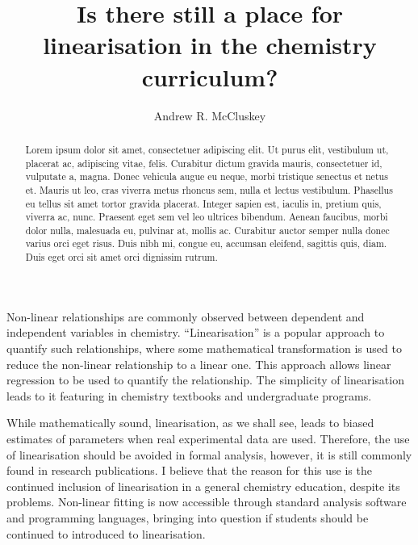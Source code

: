 \documentclass[reprint,superscriptaddress,nobibnotes,amsmath,amssymb]{revtex4-2}
\begin{document}
\title{Is there still a place for linearisation in the chemistry curriculum?}

\author{Andrew R. McCluskey}

\begin{abstract}
    Lorem ipsum dolor sit amet, consectetuer adipiscing elit.
    Ut purus elit, vestibulum ut, placerat ac, adipiscing vitae, felis.
    Curabitur dictum gravida mauris, consectetuer id, vulputate a, magna.
    Donec vehicula augue eu neque, morbi tristique senectus et netus et.
    Mauris ut leo, cras viverra metus rhoncus sem, nulla et lectus vestibulum.
    Phasellus eu tellus sit amet tortor gravida placerat.
    Integer sapien est, iaculis in, pretium quis, viverra ac, nunc.
    Praesent eget sem vel leo ultrices bibendum.
    Aenean faucibus, morbi dolor nulla, malesuada eu, pulvinar at, mollis ac.
    Curabitur auctor semper nulla donec varius orci eget risus.
    Duis nibh mi, congue eu, accumsan eleifend, sagittis quis, diam.
    Duis eget orci sit amet orci dignissim rutrum.
\end{abstract}

\maketitle 

Non-linear relationships are commonly observed between dependent and independent variables in chemistry.
``Linearisation'' is a popular approach to quantify such relationships, where some mathematical transformation is used to reduce the non-linear relationship to a linear one. 
This approach allows linear regression to be used to quantify the relationship. 
The simplicity of linearisation leads to it featuring in chemistry textbooks \cite{monk_math_2010,atkins_physical_2018} and undergraduate programs.

While mathematically sound, linearisation, as we shall see, leads to biased estimates of parameters when real experimental data are used. 
Therefore, the use of linearisation should be avoided in formal analysis, however, it is still commonly found in research publications.
I believe that the reason for this use is the continued inclusion of linearisation in a general chemistry education, despite its problems.
Non-linear fitting is now accessible through standard analysis software and programming languages, bringing into question if students should be continued to introduced to linearisation. 
\end{document}
